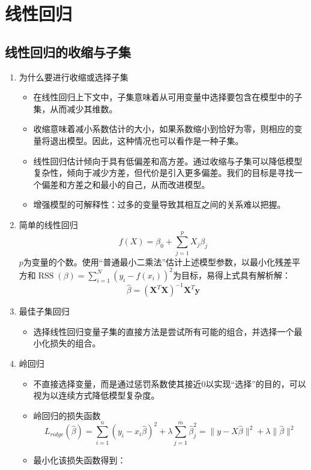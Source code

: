 \documentclass[UTF8]{article}%
\begin{document}
	\newpage
	\section{线性回归}
		\subsection{线性回归的收缩与子集}
			\begin{enumerate}
				\item 为什么要进行收缩或选择子集
					\begin{itemize}
						\item 在线性回归上下文中，子集意味着从可用变量中选择要包含在模型中的子集，从而减少其维数。
						\item 收缩意味着减小系数估计的大小，如果系数缩小到恰好为零，则相应的变量将退出模型。因此，这种情况也可以看作是一种子集。
						\item \color{red}线性回归估计倾向于具有低偏差和高方差。\color{black}通过收缩与子集可以降低模型复杂性，倾向于减少方差，但代价是引入更多偏差。我们的目标是寻找一个偏差和方差之和最小的自己，从而改进模型。
						\item 增强模型的可解释性：过多的变量导致其相互之间的关系难以把握。
					\end{itemize}
				\item 简单的线性回归
				 $$
				 f(X)=\beta_{0}+\sum_{j=1}^{p} X_{j} \beta_{j}
				 $$
				 $p$为变量的个数。使用“普通最小二乘法”估计上述模型参数，以最小化残差平方和$\operatorname{RSS}(\beta)=\sum_{i=1}^{N}\left(y_{i}-f\left(x_{i}\right)\right)^{2}$为目标，易得上式具有解析解：
				 $$
				 \hat{\beta}=\left(\mathbf{X}^{T} \mathbf{X}\right)^{-1} \mathbf{X}^{T} \mathbf{y}
				 $$
				 \item 最佳子集回归
				 	\begin{itemize}
				 		\item 选择线性回归变量子集的直接方法是尝试所有可能的组合，并选择一个最小化损失的组合。
				 	\end{itemize}
			 	\item 岭回归
				 	\begin{itemize}
				 		\item 不直接选择变量，而是通过惩罚系数使其接近0以实现“选择”的目的，可以视为以连续方式降低模型复杂度。
				 		\item 岭回归的损失函数
				 		$$
				 		L_{ridge}(\hat{\beta})=\sum_{i=1}^{n}\left(y_{i}-x_{i} \hat{\beta}\right)^{2}+\lambda \sum_{j=1}^{m} \hat{\beta}_{j}^{2}=\|y-X \hat{\beta}\|^{2}+\lambda\|\hat{\beta}\|^{2}
				 		$$
				 		\item 最小化该损失函数得到：

\end{itemize}
\end{enumerate}
\end{document}
